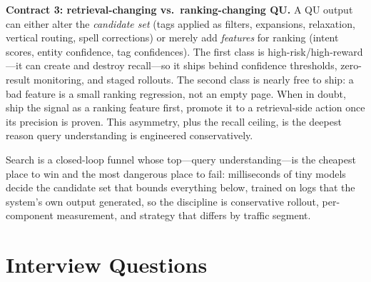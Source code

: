 \textbf{Contract 3: retrieval-changing vs.\ ranking-changing QU.} A QU output can either alter the \textit{candidate set} (tags applied as filters, expansions, relaxation, vertical routing, spell corrections) or merely add \textit{features} for ranking (intent scores, entity confidence, tag confidences). The first class is high-risk/high-reward---it can create and destroy recall---so it ships behind confidence thresholds, zero-result monitoring, and staged rollouts. The second class is nearly free to ship: a bad feature is a small ranking regression, not an empty page. When in doubt, ship the signal as a ranking feature first, promote it to a retrieval-side action once its precision is proven. This asymmetry, plus the recall ceiling, is the deepest reason query understanding is engineered conservatively.

\begin{keyinsight}
Search is a closed-loop funnel whose top---query understanding---is the cheapest place to win and the most dangerous place to fail: milliseconds of tiny models decide the candidate set that bounds everything below, trained on logs that the system's own output generated, so the discipline is conservative rollout, per-component measurement, and strategy that differs by traffic segment.
\end{keyinsight}

\section{Interview Questions}
\label{sr:sec:qu_interview_questions}


